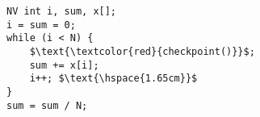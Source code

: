 \documentclass[border={15pt 0pt 0pt 0pt}]{standalone} %
\begin{document}
	

\begin{lstlisting}[style=mystyle, linewidth=87px]
NV int i, sum, x[];
i = sum = 0;
while (i < N) {
    $\text{\textcolor{red}{checkpoint()}}$;
    sum += x[i];
    i++; $\text{\hspace{1.65cm}}$
}
sum = sum / N;
\end{lstlisting} 
\end{document}
